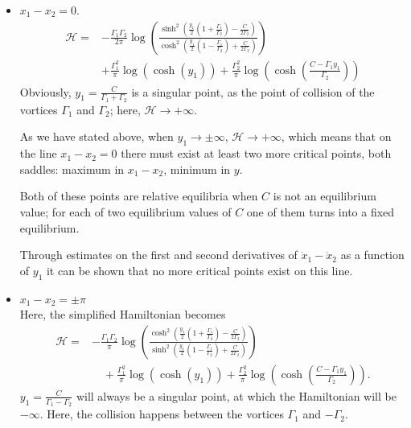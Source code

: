 \documentclass[11pt,twoside]{article}
\theoremstyle{definition}
\numberwithin{equation}{section}
\begin{document}
\begin{itemize}
    \item $x_1-x_2 = 0$.
    \begin{equation*}
        \begin{split}
            \mathcal{H} =& -\frac{\Gamma_1\Gamma_2}{2\pi}\log\left(\frac{\sinh^2\left(\frac{y_1}{2}\left(1 + \frac{\Gamma_1}{\Gamma_2}\right) - \frac{C}{2\Gamma_2}\right)}{\cosh^2\left(\frac{y_1}{2}\left(1 - \frac{\Gamma_1}{\Gamma_2}\right) + \frac{C}{2\Gamma_2}\right)}\right)\\
            &+\frac{\Gamma_1^2}{\pi}\log(\cosh(y_1)) + \frac{\Gamma_2^2}{\pi}\log\left(\cosh\left(\frac{C-\Gamma_1y_1}{\Gamma_2}\right)\right)
        \end{split}
    \end{equation*}
       Obviously, $y_1 = \frac{C}{\Gamma_1 + \Gamma_2}$ is a singular point, as the point  of collision of the vortices $\Gamma_1$ and $\Gamma_2$; here, $\mathcal{H}\to +\infty$. 
    
          As we have stated above, when $y_1\to \pm\infty$, $\mathcal{H}\to +\infty$, which means that on the line $x_1-x_2=0$ there must exist at least two more critical points, both saddles: maximum in $x_1-x_2$, minimum in $y$. 
            
       Both of these points are relative equilibria  when $C$ is not an equilibrium value; for each of two equilibrium values of $C$ one of them turns into a fixed equilibrium.
       
       Through estimates on the first and second derivatives of $\dot{x}_1-\dot{x}_2$ as a function of $y_1$ it can be shown that no more  critical points exist on this line. 
       \item $x_1-x_2 = \pm\pi$\\
       
       Here, the simplified Hamiltonian becomes 
       \begin{equation*}
        \begin{split}
           \mathcal{H} =& -\frac{\Gamma_1\Gamma_2}{\pi}\log\left(\frac{\cosh^2\left(\frac{y_1}{2}\left(1 + \frac{\Gamma_1}{\Gamma_2}\right) - \frac{C}{2\Gamma_2}\right)}{\sinh^2\left(\frac{y_1}{2}\left(1 - \frac{\Gamma_1}{\Gamma_2}\right) + \frac{C}{2\Gamma_2}\right)}\right) \\
           &\quad+\frac{\Gamma_1^2}{\pi}\log\left(\cosh(y_1)\right) + \frac{\Gamma_2^2}{\pi}\log\left(\cosh\left(\frac{C-\Gamma_1y_1}{\Gamma_2}\right)\right).
        \end{split}
    \end{equation*}
      $y_1 = \frac{C}{\Gamma_1-\Gamma_2}$ will always be a singular point, at which the Hamiltonian will be $-\infty$. Here, the collision happens between the vortices $\Gamma_1$ and $-\Gamma_2$.
   
\end{itemize}
\end{document}
